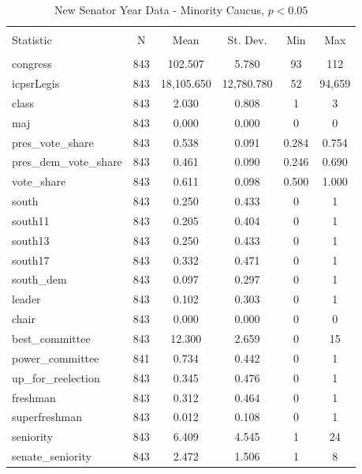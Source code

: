 \documentclass[12pt]{article}
\begin{document}
\begin{table}[!htbp] \centering 
	\caption{New Senator Year Data - Minority Caucus, $ p < 0.05 $} 
	\begin{tabular}{@{\extracolsep{5pt}}lccccc} 
		\\[-1.8ex]\hline 
		\hline \\[-1.8ex] 
		Statistic & \multicolumn{1}{c}{N} & \multicolumn{1}{c}{Mean} & \multicolumn{1}{c}{St. Dev.} & \multicolumn{1}{c}{Min} & \multicolumn{1}{c}{Max} \\ 
		\hline \\[-1.8ex] 
		congress & 843 & 102.507 & 5.780 & 93 & 112 \\ 
		icpsrLegis & 843 & 18,105.650 & 12,780.780 & 52 & 94,659 \\ 
		class & 843 & 2.030 & 0.808 & 1 & 3 \\ 
		maj & 843 & 0.000 & 0.000 & 0 & 0 \\ 
		pres\_vote\_share & 843 & 0.538 & 0.091 & 0.284 & 0.754 \\ 
		pres\_dem\_vote\_share & 843 & 0.461 & 0.090 & 0.246 & 0.690 \\ 
		vote\_share & 843 & 0.611 & 0.098 & 0.500 & 1.000 \\ 
		south & 843 & 0.250 & 0.433 & 0 & 1 \\ 
		south11 & 843 & 0.205 & 0.404 & 0 & 1 \\ 
		south13 & 843 & 0.250 & 0.433 & 0 & 1 \\ 
		south17 & 843 & 0.332 & 0.471 & 0 & 1 \\ 
		south\_dem & 843 & 0.097 & 0.297 & 0 & 1 \\ 
		leader & 843 & 0.102 & 0.303 & 0 & 1 \\ 
		chair & 843 & 0.000 & 0.000 & 0 & 0 \\ 
		best\_committee & 843 & 12.300 & 2.659 & 0 & 15 \\ 
		power\_committee & 841 & 0.734 & 0.442 & 0 & 1 \\ 
		up\_for\_reelection & 843 & 0.345 & 0.476 & 0 & 1 \\ 
		freshman & 843 & 0.312 & 0.464 & 0 & 1 \\ 
		superfreshman & 843 & 0.012 & 0.108 & 0 & 1 \\ 
		seniority & 843 & 6.409 & 4.545 & 1 & 24 \\ 
		senate\_seniority & 843 & 2.472 & 1.506 & 1 & 8 \\ 

\end{tabular}
\end{table}
\end{document}
